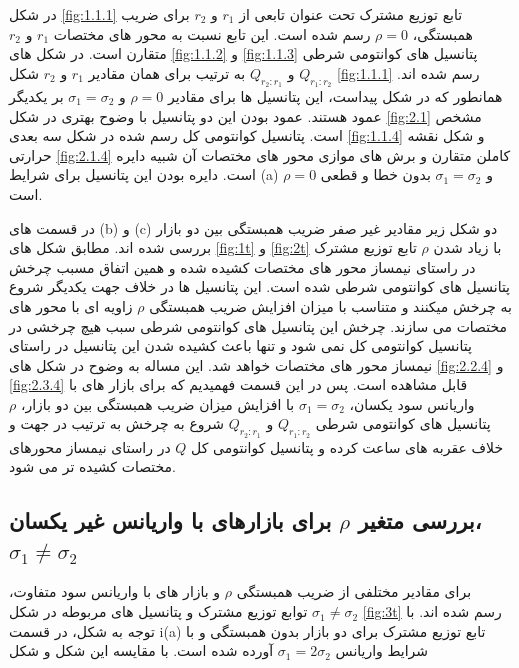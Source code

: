 \documentclass[a4paper,titlepage,12pt,fleqn,oneside]{report}
\begin{document}
	در شکل 
	\ref{fig:1.1.1}
	تابع توزیع مشترک تحت عنوان تابعی از 
	$r_1$
	و
	$r_2$
	برای ضریب همبستگی، 
	$\rho=0$
	رسم شده است. این تابع نسبت به محور های مختصات 
	$r_1$
	و
	$r_2$
	متقارن است. در شکل های 
	\ref{fig:1.1.2}
	و
	\ref{fig:1.1.3}
	پتانسیل های کوانتومی شرطی 
	$Q_{r_1:r_2}$
	و
	$Q_{r_2:r_1}$
	به ترتیب برای همان مقادیر 
	$r_1$
	و
	$r_2$
	شکل
	\ref{fig:1.1.1}
	رسم شده اند. همانطور که در شکل پیداست، این پتانسیل ها برای مقادیر 
	$\rho=0$
	و 
	$\sigma_1=\sigma_2$
	بر یکدیگر عمود هستند. عمود بودن این دو پتانسیل با وضوح بهتری در شکل 
	\ref{fig:2.1}
	مشخص است. پتانسیل کوانتومی کل رسم شده در شکل سه بعدی
	\ref{fig:1.1.4}
	و شکل نقشه حرارتی 
	\ref{fig:2.1.4}
	کاملن متقارن و برش های موازی محور های مختصات آن شبیه دایره است. دایره  بودن این پتانسیل برای شرایط (a)
	$\rho=0$
	و 
	$\sigma_1=\sigma_2$
	بدون خطا و قطعی است.
	
	در قسمت های (b) و (c) دو شکل زیر مقادیر غیر صفر ضریب همبستگی بین دو بازار بررسی شده اند.
	مطابق شکل های
	\ref{fig:1t}
	و 
	\ref{fig:2t}
	با زیاد شدن 
	$\rho$
	تابع توزیع مشترک در راستای نیمساز محور های مختصات کشیده شده و همین اتفاق مسبب چرخش پتانسیل های کوانتومی شرطی شده است. این پتانسیل ها در خلاف جهت یکدیگر شروع به چرخش میکنند و متناسب با میزان افزایش ضریب همبستگی 
	$\rho$
	زاویه ای با محور های مختصات می سازند. چرخش این پتانسیل های کوانتومی شرطی سبب هیچ چرخشی در پتانسیل کوانتومی کل نمی شود و تنها باعث کشیده شدن این پتانسیل در راستای نیمساز محور های مختصات خواهد شد. این مساله به وضوح در شکل های
	\ref*{fig:2.2.4}
	و 
	\ref*{fig:2.3.4}
	قابل مشاهده است.
	پس در این قسمت فهمیدیم که برای بازار های با واریانس سود یکسان، 
	$\sigma_1=\sigma_2$
	با افزایش میزان ضریب همبستگی بین دو بازار، 
	$\rho$
	پتانسیل های کوانتومی شرطی 
	$Q_{r_1:r_2}$
	و
	$Q_{r_2:r_1}$
	شروع به چرخش به ترتیب در جهت و خلاف عقربه های ساعت کرده و پتانسیل کوانتومی کل 
	$Q$
	در راستای نیمساز محورهای مختصات کشیده تر می شود. 
	
	\subsection{
		بررسی متغیر 
		$\rho$
		برای بازارهای با واریانس غیر  یکسان،
		$\sigma_1 \neq \sigma_2$
	}
	برای مقادیر مختلفی از ضریب همبستگی 
	$\rho$
	و بازار های با واریانس سود متفاوت،
	$\sigma_1 \neq \sigma_2$
	توابع توزیع مشترک و پتانسیل های مربوطه در شکل 
	\ref{fig:3t}
	رسم شده اند.  با توجه به شکل، در قسمت i(a) تابع توزیع مشترک برای دو بازار بدون همبستگی و با شرایط واریانس
	$\sigma_1 =2\sigma_2$
	آورده شده است. با مقایسه این شکل و شکل 
	
\end{document}
